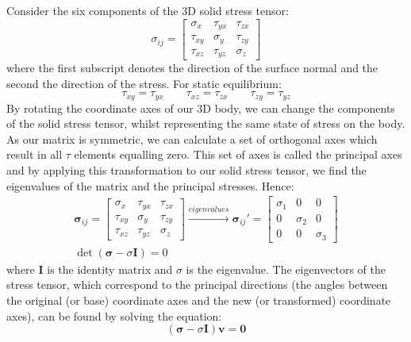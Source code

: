 Consider the six components of the 3D solid stress tensor:
\begin{equation}
    \sigma_{ij} = \begin{bmatrix}
        \sigma_x  & \tau_{yx} & \tau_{zx} \\
        \tau_{xy} & \sigma_y  & \tau_{zy} \\
        \tau_{xz} & \tau_{yz} & \sigma_z
    \end{bmatrix}
\end{equation}
where the first subscript denotes the direction of the surface normal and the second the direction of the stress. For static equilibrium:
\begin{equation}
    \tau_{xy} = \tau_{yx} \qquad \tau_{xz} = \tau_{zx} \qquad \tau_{zy} = \tau_{yz}
\end{equation}
By rotating the coordinate axes of our 3D body, we can change the components of the solid stress tensor, whilst representing the same state of stress on the body. As our matrix is symmetric, we can calculate a set of orthogonal axes which result in all $\tau$ elements equalling zero. This set of axes is called the principal axes and by applying this transformation to our solid stress tensor, we find the eigenvalues of the matrix and the principal stresses. Hence:
\begin{gather}
    \boldsymbol{\sigma}_{ij} = \begin{bmatrix}
        \sigma_x  & \tau_{yx} & \tau_{zx} \\
        \tau_{xy} & \sigma_y  & \tau_{zy} \\
        \tau_{xz} & \tau_{yz} & \sigma_z
    \end{bmatrix} \xrightarrow{eigenvalues} \boldsymbol{\sigma}_{ij}' = \begin{bmatrix}
        \sigma_1 & 0        & 0        \\
        0        & \sigma_2 & 0        \\
        0        & 0        & \sigma_3
    \end{bmatrix}\\
    \det(\boldsymbol{\sigma} - \sigma \boldsymbol{I}) = 0
\end{gather}
where $\boldsymbol{I}$ is the identity matrix and $\sigma$ is the eigenvalue. The eigenvectors of the stress tensor, which correspond to the principal directions (the angles between the original (or base) coordinate axes and the new (or transformed) coordinate axes), can be found by solving the equation:
\begin{equation}
    (\boldsymbol{\sigma} - \sigma \boldsymbol{I})\boldsymbol{v} = \boldsymbol{0}
\end{equation}
